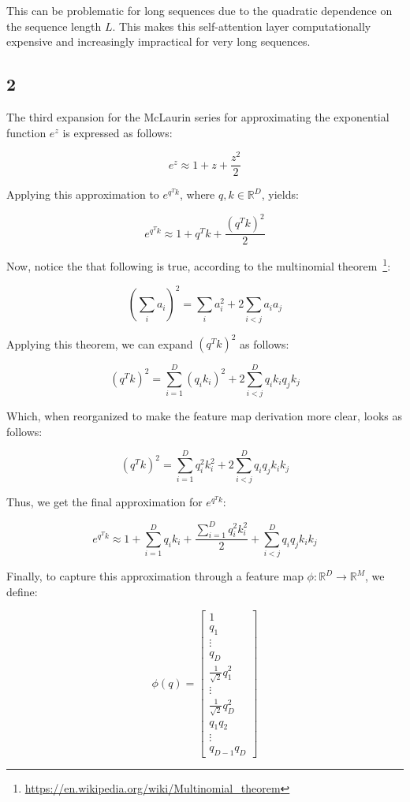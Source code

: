\documentclass[11pt]{article}
\begin{document}
This can be problematic for long sequences due to the quadratic dependence on the sequence length \(L\). This makes this self-attention layer computationally expensive and increasingly impractical for very long sequences.

\subsection*{2}

The third expansion for the McLaurin series for approximating the exponential function $e^z$ is expressed as follows:

\begin{equation}
e^z \approx 1 + z + \frac{z^2}{2}
\label{q1:2-mclaurin}
\end{equation}

Applying this approximation to \(e^{q^Tk}\), where \(q, k \in \mathbb{R}^D\), yields:

\[
e^{q^Tk} \approx 1 + q^Tk + \frac{(q^Tk)^2}{2}
\]

Now, notice the that following is true, according to the multinomial theorem~\footnote{\url{https://en.wikipedia.org/wiki/Multinomial_theorem}}:

\[
(\sum_{i}{a_i})^2 = \sum_{i}{a_i^2} + 2 \sum_{i < j}{a_ia_j}
\]

Applying this theorem, we can expand \((q^T k)^2\) as follows:

\[
(q^Tk)^2 = \sum_{i=1}^{D}{(q_i k_i)}^2 + 2 \sum_{i < j}^{D}{q_i k_i q_j k_j}
\]

Which, when reorganized to make the feature map derivation more clear, looks as follows:

\[
(q^Tk)^2 = \sum_{i=1}^{D}{q_i^2 k_i^2} + 2 \sum_{i < j}^{D}{q_i q_j k_i k_j}
\]

Thus, we get the final approximation for \(e^{q^Tk}\):

\[
e^{q^Tk} \approx 1 + \sum_{i=1}^{D}{q_i k_i} + \frac{\sum_{i=1}^{D}{q_i^2 k_i^2}}{2} + \sum_{i < j}^{D}{q_i q_j k_i k_j}
\]

Finally, to capture this approximation through a feature map \(\phi: \mathbb{R}^D \rightarrow \mathbb{R}^M\), we define:

\[
\phi(q) = 
\begin{bmatrix} 
1 \\ 

q_1 \\ 
\vdots \\ 
q_D \\

\frac{1}{\sqrt{2}}q_1^2 \\
\vdots \\
\frac{1}{\sqrt{2}}q_D^2 \\

q_1q_2 \\
\vdots \\
q_{D-1}q_D
\end{bmatrix}
\]
\end{document}
